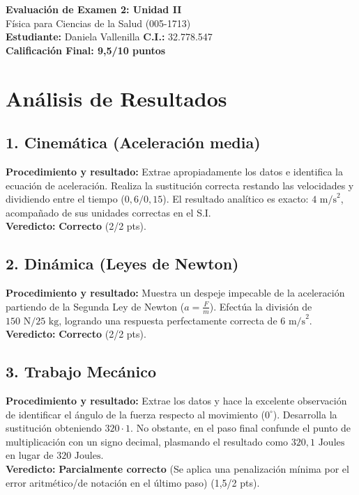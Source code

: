 \documentclass[12pt,letterpaper]{article}
\begin{document}
\begin{center}
    \Large \textbf{Evaluación de Examen 2: Unidad II} \\
    \large Física para Ciencias de la Salud (005-1713) \\
    \vspace{0.5cm}
    \textbf{Estudiante:} Daniela Vallenilla \quad \textbf{C.I.:} 32.778.547
    \vspace{0.3cm} \\
    \large \textbf{Calificación Final: 9,5/10 puntos}
\end{center}

\vspace{0.5cm}

\section*{Análisis de Resultados}

\subsection*{1. Cinemática (Aceleración media)}
\textbf{Procedimiento y resultado:} Extrae apropiadamente los datos e identifica la ecuación de aceleración. Realiza la sustitución correcta restando las velocidades y dividiendo entre el tiempo ($0,6 / 0,15$). El resultado analítico es exacto: $4 \text{ m/s}^2$, acompañado de sus unidades correctas en el S.I. \\
\textbf{Veredicto:} \textbf{Correcto} (2/2 pts).

\subsection*{2. Dinámica (Leyes de Newton)}
\textbf{Procedimiento y resultado:} Muestra un despeje impecable de la aceleración partiendo de la Segunda Ley de Newton ($a = \frac{F}{m}$). Efectúa la división de $150 \text{ N} / 25 \text{ kg}$, logrando una respuesta perfectamente correcta de $6 \text{ m/s}^2$. \\
\textbf{Veredicto:} \textbf{Correcto} (2/2 pts).

\subsection*{3. Trabajo Mecánico}
\textbf{Procedimiento y resultado:} Extrae los datos y hace la excelente observación de identificar el ángulo de la fuerza respecto al movimiento ($0^\circ$). Desarrolla la sustitución obteniendo $320 \cdot 1$. No obstante, en el paso final confunde el punto de multiplicación con un signo decimal, plasmando el resultado como $320,1 \text{ Joules}$ en lugar de $320 \text{ Joules}$. \\
\textbf{Veredicto:} \textbf{Parcialmente correcto} (Se aplica una penalización mínima por el error aritmético/de notación en el último paso) (1,5/2 pts).
\end{document}
